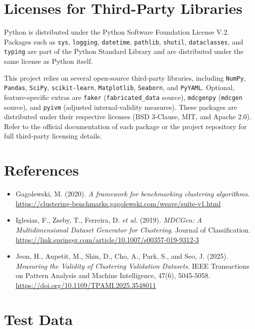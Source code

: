 \documentclass[a4paper,12pt]{article}
\begin{document}
\section*{Licenses for Third-Party Libraries}

Python is distributed under the Python Software Foundation License V.2. Packages such as \texttt{sys}, \texttt{logging}, \texttt{datetime}, \texttt{pathlib}, \texttt{shutil}, \texttt{dataclasses}, and \texttt{typing} are part of the Python Standard Library and are distributed under the same license as Python itself.

This project relies on several open-source third-party libraries, including \texttt{NumPy}, \texttt{Pandas}, \texttt{SciPy}, \texttt{scikit-learn}, \texttt{Matplotlib}, \texttt{Seaborn}, and \texttt{PyYAML}. Optional, feature-specific extras are \texttt{faker} (\texttt{fabricated\_data} source), \texttt{mdcgenpy} (\texttt{mdcgen} source), and \texttt{pyivm} (adjusted internal-validity measures). These packages are distributed under their respective licenses (BSD 3-Clause, MIT, and Apache 2.0). Refer to the official documentation of each package or the project repository for full third-party licensing details.

\section{References}
\begin{itemize}
    \item Gagolewski, M. (2020). \textit{A framework for benchmarking clustering algorithms}. \url{https://clustering-benchmarks.gagolewski.com/weave/suite-v1.html}
    \item Iglesias, F., Zseby, T., Ferreira, D. \textit{et al.} (2019). \textit{MDCGen: A Multidimensional Dataset Generator for Clustering}. Journal of Classification. \url{https://link.springer.com/article/10.1007/s00357-019-9312-3}
    \item Jeon, H., Aupetit, M., Shin, D., Cho, A., Park, S., and Seo, J. (2025). \textit{Measuring the Validity of Clustering Validation Datasets}. IEEE Transactions on Pattern Analysis and Machine Intelligence, 47(6), 5045-5058. \url{https://doi.org/10.1109/TPAMI.2025.3548011}
\end{itemize}

\newpage

\section{Test Data}
\end{document}
